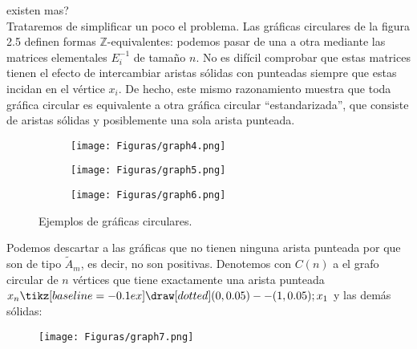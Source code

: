 \newpage
\textquestiondown existen mas?\\
Trataremos de simplificar un poco el problema. Las gráficas circulares de la figura 2.5 definen formas $\mathbb{Z}$-equivalentes: podemos pasar de una a otra mediante las matrices elementales $E_{i}^{-1}$ de tamaño $n$. No es difícil comprobar que estas matrices tienen el efecto de intercambiar aristas sólidas con punteadas siempre que estas incidan en el vértice $x_{i}$. De hecho, este mismo razonamiento muestra que toda gráfica circular es equivalente a otra gráfica circular “estandarizada”, que consiste de aristas sólidas y posiblemente una sola arista punteada.\\
\begin{figure}[h]
    \begin{subfigure}[b]{0.3\textwidth}
      \begin{minipage}{7cm}
	\centering%
	    \texttt{[image: Figuras/graph4.png]}
	 \end{minipage}
	\caption{}
     \end{subfigure}
     \begin{subfigure}[b]{0.3\textwidth}
        \begin{minipage}{7cm}
       	 \centering%
	    \texttt{[image: Figuras/graph5.png]}
        \end{minipage}
        \caption{}
     \end{subfigure}
     \begin{subfigure}[b]{0.3\textwidth}
        \begin{minipage}{7cm}
       	 \centering%
	    \texttt{[image: Figuras/graph6.png]}
        \end{minipage}
        \caption{}
     \end{subfigure}
     \caption{Ejemplos de gráficas circulares.}
    \label{figura:2.5}
\end{figure}
Podemos descartar a las gráficas que no tienen ninguna arista punteada por que son de tipo $\tilde{A}_{m}$, es decir, no son positivas. Denotemos con $C\left(n\right)$ a el grafo circular de $n$ vértices que tiene exactamente una arista punteada $x_{n} \tikz[baseline=-0.1ex]\draw [dotted] (0,0.05) -- (1,0.05); x_{1}$ y las demás sólidas:
\begin{figure}[h]
   \centering%
   \texttt{[image: Figuras/graph7.png]}
\end{figure}
